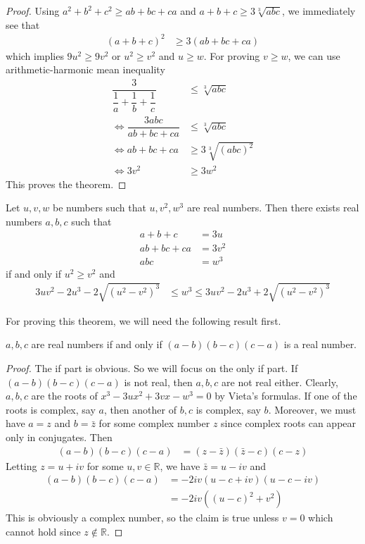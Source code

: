 \documentclass{subfile}
\begin{document}
		\begin{proof}
			Using $a^{2}+b^{2}+c^{2}\geq ab+bc+ca$ and $a+b+c\geq 3\sqrt[3]{abc}$, we immediately see that
				\begin{align*}
					(a+b+c)^{2}
						& \geq 3(ab+bc+ca)
				\end{align*}
			which implies $9u^{2}\geq 9v^{2}$ or $u^{2}\geq v^{2}$ and $u\geq w$. For proving $v\geq w$, we can use arithmetic-harmonic mean inequality
				\begin{align*}
					\dfrac{3}{\dfrac{1}{a}+\dfrac{1}{b}+\dfrac{1}{c}}
						& \leq \sqrt[3]{abc}\\
					\iff \dfrac{3abc}{ab+bc+ca}
						& \leq \sqrt[3]{abc}\\
					\iff ab+bc+ca
						& \geq 3\sqrt[3]{(abc)^{2}}\\
					\iff 3v^{2}
						& \geq 3w^{2}
				\end{align*}
			This proves the theorem.
		\end{proof}


		\begin{theorem}\label{thm:uvw}
			Let $u,v,w$ be numbers such that $u,v^{2},w^{3}$ are real numbers. Then there exists real numbers $a,b,c$ such that
				\begin{align*}
					a+b+c
						& = 3u\\
					ab+bc+ca
						& = 3v^{2}\\
					abc
						& = w^{3}
				\end{align*}
			if and only if $u^{2}\geq v^{2}$ and
				\begin{align*}
					3uv^{2}-2u^{3}-2\sqrt{(u^{2}-v^{2})^{3}}
						& \leq w^{3} \leq 3uv^{2}-2u^{3}+2\sqrt{(u^{2}-v^{2})^{3}}
				\end{align*}
		\end{theorem}
	For proving this theorem, we will need the following result first.
		\begin{theorem}\label{thm:abc}
			$a,b,c$ are real numbers if and only if $(a-b)(b-c)(c-a)$ is a real number.
		\end{theorem}

		\begin{proof}
			The if part is obvious. So we will focus on the only if part. If $(a-b)(b-c)(c-a)$ is not real, then $a,b,c$ are not real either. Clearly, $a,b,c$ are the roots of $x^{3}-3ux^{2}+3vx-w^{3}=0$ by Vieta's formulas. If one of the roots is complex, say $a$, then another of $b,c$ is complex, say $b$. Moreover, we must have $a=z$ and $b=\bar{z}$ for some complex number $z$ since complex roots can appear only in conjugates. Then
				\begin{align*}
					(a-b)(b-c)(c-a)
						& = (z-\bar{z})(\bar{z}-c)(c-z)
				\end{align*}
			Letting $z=u+iv$ for some $u,v\in\mathbb{R}$, we have $\bar{z}=u-iv$ and
				\begin{align*}
					(a-b)(b-c)(c-a)
						& = -2iv(u-c+iv)(u-c-iv)\\
						& = -2iv\left((u-c)^{2}+v^{2}\right)
				\end{align*}
			This is obviously a complex number, so the claim is true unless $v=0$ which cannot hold since $z\not\in\mathbb{R}$.
		\end{proof}
\end{document}
